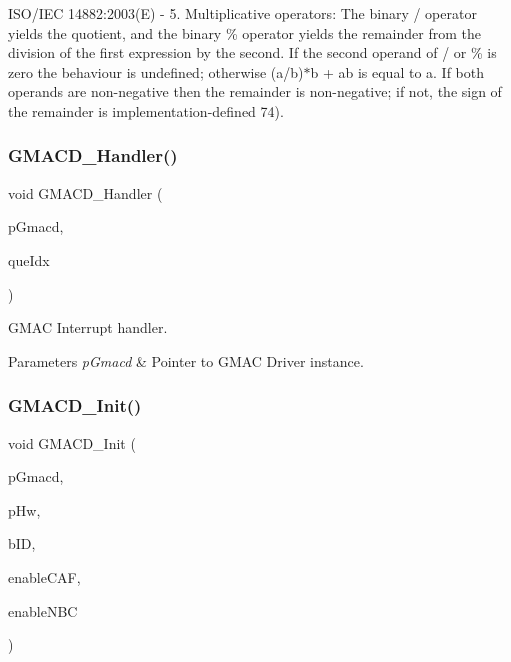 I\+S\+O/\+I\+EC 14882\+:2003(E) -\/ 5. Multiplicative operators\+: The binary / operator yields the quotient, and the binary \% operator yields the remainder from the division of the first expression by the second. If the second operand of / or \% is zero the behaviour is undefined; otherwise (a/b)$\ast$b + ab is equal to a. If both operands are non-\/negative then the remainder is non-\/negative; if not, the sign of the remainder is implementation-\/defined 74). \mbox{\label{group__gmacd__defines_ga782194c9b7163c22016beabc6101856c}} 
\subsubsection{\texorpdfstring{GMACD\_Handler()}{GMACD\_Handler()}}
{\footnotesize\ttfamily void G\+M\+A\+C\+D\+\_\+\+Handler (\begin{DoxyParamCaption}\item[{\mbox{\hyperlink{group__gmacd__types_gaa8760917079000a5ee7fbc7fab992dd3}{s\+Gmacd}} $\ast$}]{p\+Gmacd,  }\item[{gmac\+Que\+List\+\_\+t}]{que\+Idx }\end{DoxyParamCaption})}



G\+M\+AC Interrupt handler. 


\begin{DoxyParams}{Parameters}
{\em p\+Gmacd} & Pointer to G\+M\+AC Driver instance. \\
\hline
\end{DoxyParams}
\mbox{\label{group__gmacd__defines_ga8706caf686e1d073851111db1ba2663c}} 
\subsubsection{\texorpdfstring{GMACD\_Init()}{GMACD\_Init()}}
{\footnotesize\ttfamily void G\+M\+A\+C\+D\+\_\+\+Init (\begin{DoxyParamCaption}\item[{\mbox{\hyperlink{group__gmacd__types_gaa8760917079000a5ee7fbc7fab992dd3}{s\+Gmacd}} $\ast$}]{p\+Gmacd,  }\item[{\mbox{\hyperlink{structGmac}{Gmac}} $\ast$}]{p\+Hw,  }\item[{uint8\+\_\+t}]{b\+ID,  }\item[{uint8\+\_\+t}]{enable\+C\+AF,  }\item[{uint8\+\_\+t}]{enable\+N\+BC }\end{DoxyParamCaption})}




